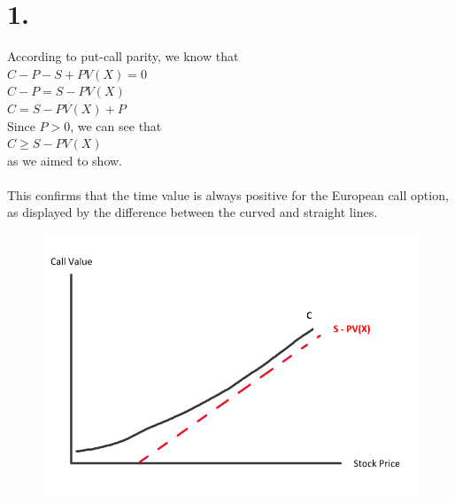 \documentclass{article}
\begin{document}
\thispagestyle{firstpageheader}

\section*{1.}

{\Large 

According to put-call parity, we know that \\
$C - P - S + PV(X) = 0$ \\
$C - P = S - PV(X)$ \\
$C = S - PV(X) + P$ \\
Since $P > 0$, we can see that \\
$C \geq S - PV(X)$ \\
as we aimed to show. \\ \\
This confirms that the time value is always positive for the European call option, as displayed by the difference between the curved and straight lines.

\begin{figure}[h]
  \centering
  \includegraphics[width=120mm]{./1.png}
\end{figure}

\newpage

}
\end{document}
